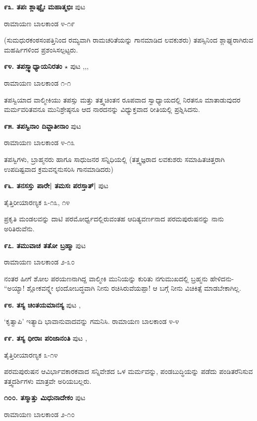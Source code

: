 \medskip
\noindent\textbf{೯೩. ತಪಃ ಶ್ಲಾಘ್ಯೈಃ ಮಹಾತ್ಮಭಿಃ} \hfill ಪುಟ \pageref{211}

\hfill ರಾಮಾಯಣ ಬಾಲಕಾಂಡ ೪-೧೯

(ಸುಮಧುರಕಂಠಸಂಪತ್ತಿನಿಂದ ರಮ್ಯವಾಗಿ ರಾಮಚರಿತೆಯನ್ನು ಗಾನಮಾಡಿದ ಲವಕುಶರು) ತಪಸ್ಸಿನಿಂದ ಶ್ಲಾಘ್ಯರಾಗಿರುವ ಮಹರ್ಷಿಗಳಿಂದ ಪ್ರಶಂಸಿಸಲ್ಪಟ್ಟರು. 

\medskip
\noindent\textbf{೯೪. ತಪಸ್ಸ್ವಾಧ್ಯಾಯನಿರತಂ} $\star$ \hfill ಪುಟ \pageref{153},\pageref{162},\pageref{194},\pageref{232}

\hfill ರಾಮಾಯಣ ಬಾಲಕಾಂಡ ೧-೧

ತಪಸ್ವಿಯಾದ ವಾಲ್ಮೀಕಿಯು ತಪಸ್ಸು ಮತ್ತು ತತ್ತ್ವಚಿಂತನ ರೂಪವಾದ ಸ್ವಾಧ್ಯಾಯದಲ್ಲಿ ನಿರತನೂ ಮಾತಾಡುವುದರ ಮರ್ಮವರಿತವನೂ ಮುನಿಶ್ರೇಷ್ಠನೂ ಆದ ನಾರದನನ್ನು ವಿಧ್ಯುಕ್ತವಾದ ರೀತಿಯಲ್ಲಿ ಪ್ರಶ್ನಿಸಿದನು.

\medskip
\noindent\textbf{೯೫. ತಪಸ್ವಿನಾಂ ದಿವ್ಜಾತೀನಾಂ } \hfill ಪುಟ \pageref{211}

\hfill ರಾಮಾಯಣ ಬಾಲಕಾಂಡ ೪-೧೩

ತಪಸ್ವಿಗಳು, ಬ್ರಾಹ್ಮನರು ಹಾಗೂ ಸಾಧುಜನರ ಸನ್ನಿಧಿಯಲ್ಲಿ (ತತ್ತ್ವಜ್ಞರಾದ ಲವಕುಶರು ಸಮಾಹಿತಚಿತ್ತರಾಗಿ ಉಪದಿಷ್ಟವಾದ ಕ್ರಮವನ್ನನುಸರಿಸಿ ಗಾನಮಾಡಿದರು)

\medskip
\noindent\textbf{೯೬. ತನಸಸ್ತು ಪಾರೇ| ತಮಸಃ ಪರಸ್ತಾತ್|} \hfill ಪುಟ \pageref{251}

\hfill ತೈತ್ತಿರೀಯಾರಣ್ಯಕ ೩-೧೩, ೧೪

ಪ್ರಕೃತಿ ಮಂಡಲವನ್ನು ದಾಟಿ ಪರಮೋರ್ಧ್ವದಲ್ಲಿರುವಂತಹ ಆದಿತ್ಯವರ್ಣನಾದ ಪರಮಪುರುಷನನ್ನು ನಾನು ಅರಿತಿರುವೆನು.

\medskip
\noindent\textbf{೯೭. ತಮುವಾಚ ತತೋ ಬ್ರಹ್ಮಾ} \hfill ಪುಟ \pageref{203}

\hfill ರಾಮಾಯಣ ಬಾಲಕಾಂಡ ೨-೩೦

ನಂತರ ಹೀಗೆ ಶೋಲ ಪರಯಣನಾಗಿದ್ದ ವಾಲ್ಮೀಕಿ ಮುನಿಯನ್ನು ಕುರಿತು ನಗುಮುಖದಲ್ಲಿ ಬ್ರಹ್ಮನು ಹೇಳಿದನು- ``ಅಯ್ಯಾ! ಶ್ಲೋಕವನ್ನ್ನೇ ಛಂದೋಬದ್ಧವಾಗಿ ನೀನು ರಚಿಸಿರುವೆಯಪ್ಪಾ! ಆ ಬಗ್ಗೆ ನೀನು ವಿಚಿಕಿತ್ಸೆ ಮಾಡಬೇಕಾಗಿಲ್ಲ. 

\medskip
\noindent\textbf{೯೮. ತಸ್ಯ  ಚಿಂತಯಮಾನಸ್ಯ} \hfill ಪುಟ \pageref{238},\pageref{240}

`ಕೃತ್ವಾಪಿ' ಇತ್ಯಾದಿ ಭಾವಾನುವಾದವನ್ನು ಗಮನಿಸಿ. \hfill ರಾಮಾಯಣ ಬಾಲಕಾಂಡ ೪-೪

\medskip
\noindent\textbf{೯೯. ತಸ್ಯ ಧೀರಾಃ ಪರಿಜಾನಂತಿ} \hfill ಪುಟ \pageref{150},\pageref{251}

\hfill ತೈತ್ತಿರೀಯಾರಣ್ಯಕ ೩-೧೪

ಪರಮಪುರುಷನ ಆವಿರ್ಭಾವಕಾರಕವಾದ ಸನ್ನಿವೇಶದ ಒಳ ಮರ್ಮವನ್ನು, ಪಂಡಬುದ್ಧಿಯನ್ನು ಪಡೆದು ಪಂಡಿತರೆನಿಸುವ ತತ್ತ್ವದರ್ಶಿಗಳು ಮಾತ್ರವೇ ಅರಿಯಬಲ್ಲರು.

\medskip
\noindent\textbf{೧೦೦. ತಸ್ಮಾತ್ತು ಮಿಧುನಾದೇಕಂ} \hfill ಪುಟ \pageref{198}

\hfill ರಾಮಾಯಣ ಬಾಲಕಾಂಡ ೨-೧೦

